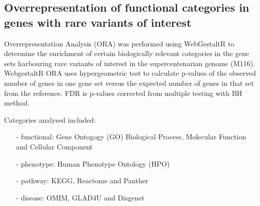 \documentclass{article}\usepackage[]{graphicx}\usepackage[dvipsnames]{xcolor}
\begin{document}
\subsection{Overrepresentation of functional categories in genes with rare variants of interest}
\label{sec:funDB}
 
Overrepresentation Analysis (ORA) was performed using WebGestaltR \cite{liao2019webgestalt} to determine the enrichment of certain biologically relevant categories in the gene sets harbouring rare variants of interest in the supercentenarian genome (M116).
WebgestaltR ORA uses hypergeometric test to calculate p-values of the observed number of genes in one gene set versus the expected number of genes in that set from the reference. FDR is p-values corrected from multiple testing with BH method.

Categories analysed included: 

\begin{itemize}
\item[-] functional: Gene Ontogogy (GO) Biological Process, Molecular Function and Cellular Component 
\item[-] phenotype: Human Phenotype Ontology (HPO)
\item[-] pathway: KEGG, Reactome and Panther
\item[-] disease: OMIM, GLAD4U and Disgenet
\end{itemize}


\end{document}
